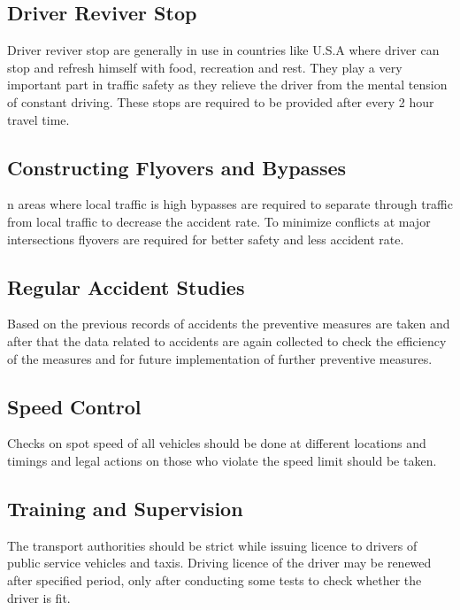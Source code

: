 \subsection{Driver Reviver Stop}
Driver reviver stop are generally in use in countries like U.S.A where driver can stop and refresh himself with food, recreation and rest. They play a very important part in traffic safety as they relieve the driver from the mental tension of constant driving. These stops are required to be provided after every 2 hour travel time.
%
\subsection{Constructing Flyovers and Bypasses}
n areas where local traffic is high bypasses are required to separate through traffic from local traffic to decrease the accident rate. To minimize conflicts at major intersections flyovers are required for better safety and less accident rate.
%
\subsection{Regular Accident Studies}
Based on the previous records of accidents the preventive measures are taken and after that the data related to accidents are again collected to check the efficiency of the measures and for future implementation of further preventive measures.
%
\subsection{Speed Control}
Checks on spot speed of all vehicles should be done at different locations and timings and legal actions on those who violate the speed limit should be taken.
\subsection{Training and Supervision}
The transport authorities should be strict while issuing licence to drivers of public service vehicles and taxis. Driving licence of the driver may be renewed after specified period, only after conducting some tests to check whether the driver is fit.